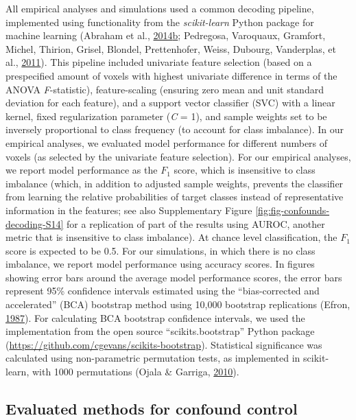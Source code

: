 \documentclass[11pt,american,]{memoir} %
\begin{document}
All empirical analyses and simulations used a common decoding pipeline, implemented using functionality from the \emph{scikit-learn} Python package for machine learning (Abraham et al., \protect\hyperlink{ref-Abraham2014-ef}{2014}\protect\hyperlink{ref-Abraham2014-ef}{b}; Pedregosa, Varoquaux, Gramfort, Michel, Thirion, Grisel, Blondel, Prettenhofer, Weiss, Dubourg, Vanderplas, et al., \protect\hyperlink{ref-Pedregosa2011-bp}{2011}). This pipeline included univariate feature selection (based on a prespecified amount of voxels with highest univariate difference in terms of the ANOVA \emph{F}-statistic), feature-scaling (ensuring zero mean and unit standard deviation for each feature), and a support vector classifier (SVC) with a linear kernel, fixed regularization parameter (\emph{C} = 1), and sample weights set to be inversely proportional to class frequency (to account for class imbalance). In our empirical analyses, we evaluated model performance for different numbers of voxels (as selected by the univariate feature selection). For our empirical analyses, we report model performance as the \(F_{1}\) score, which is insensitive to class imbalance (which, in addition to adjusted sample weights, prevents the classifier from learning the relative probabilities of target classes instead of representative information in the features; see also Supplementary Figure \ref{fig:fig-confounds-decoding-S14} for a replication of part of the results using AUROC, another metric that is insensitive to class imbalance). At chance level classification, the \(F_{1}\) score is expected to be 0.5. For our simulations, in which there is no class imbalance, we report model performance using accuracy scores. In figures showing error bars around the average model performance scores, the error bars represent 95\% confidence intervals estimated using the ``bias-corrected and accelerated'' (BCA) bootstrap method using 10,000 bootstrap replications (Efron, \protect\hyperlink{ref-efron1987better}{1987}). For calculating BCA bootstrap confidence intervals, we used the implementation from the open source ``scikits.bootstrap'' Python package (\url{https://github.com/cgevans/scikits-bootstrap}). Statistical significance was calculated using non-parametric permutation tests, as implemented in scikit-learn, with 1000 permutations (Ojala \& Garriga, \protect\hyperlink{ref-Ojala2010-rc}{2010}).

\hypertarget{confounds-decoding-methods-evaluated-methods}{%
\subsection{Evaluated methods for confound control}\label{confounds-decoding-methods-evaluated-methods}}
\end{document}
